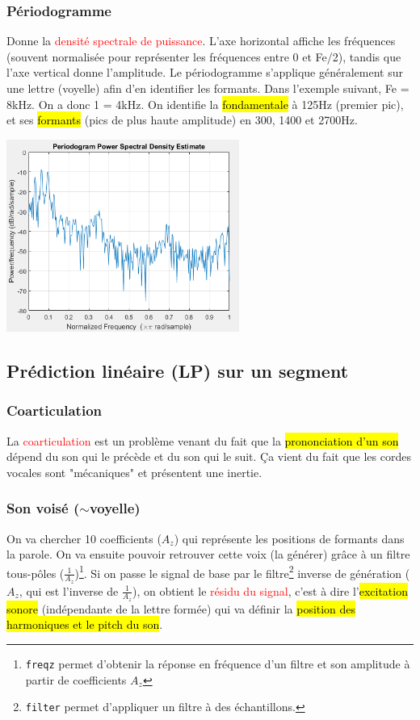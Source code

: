 \documentclass[letterpaper, 12pt]{article}
\newcommand{\alinea}{
\hspace*{0.5cm}}
\newcommand{\red}[1]{
	\textcolor{red}{#1}}
\begin{document}
			\subsubsection*{Périodogramme}
				\alinea Donne la \red{densité spectrale de puissance}.
					L'axe horizontal affiche les fréquences (souvent normalisée pour représenter les fréquences entre 0 et Fe/2),
					tandis que l'axe vertical donne l'amplitude. Le périodogramme s'applique généralement sur une lettre (voyelle) afin
					d'en identifier les formants. Dans l'exemple suivant, Fe = 8kHz. On a donc 1 = 4kHz. On identifie
					la \hl{fondamentale} à 125Hz (premier pic), et ses \hl{formants} (pics de plus haute amplitude) en 300,
					1400 et 2700Hz.
				\begin{center}
					\includegraphics[width=3in]{Images/periodogram}
				\end{center}
		\subsection{Prédiction linéaire (LP) sur un segment}
			\subsubsection*{Coarticulation}
				\alinea La \red{coarticulation} est un problème venant du fait que la \hl{prononciation d'un son} dépend du son qui 
					le précède et du son qui le suit. \c Ca vient du fait que les cordes vocales sont "mécaniques" et présentent 
					une inertie.
			\subsubsection*{Son voisé ($\sim$voyelle)}
				\alinea On va chercher 10 coefficients ($A_z$) qui représente les positions de formants dans la parole. On va ensuite
					pouvoir retrouver cette voix (la générer) grâce à un filtre tous-pôles ($\frac{1}{A_z}$)\footnote{\texttt{freqz} permet
					d'obtenir la réponse en fréquence d'un filtre et son amplitude à partir de coefficients $A_z$}. 
					Si on passe le signal de base par le filtre\footnote{\texttt{filter} permet d'appliquer un filtre à des échantillons.}
					inverse de génération ($A_z$, qui est l'inverse de $\frac{1}{A_z}$), on obtient le \red{résidu du signal}, c'est à dire 
					l'\hl{excitation sonore} (indépendante de la lettre formée) qui va définir la \hl{position des harmoniques et le pitch 
					du son}.
\end{document}

